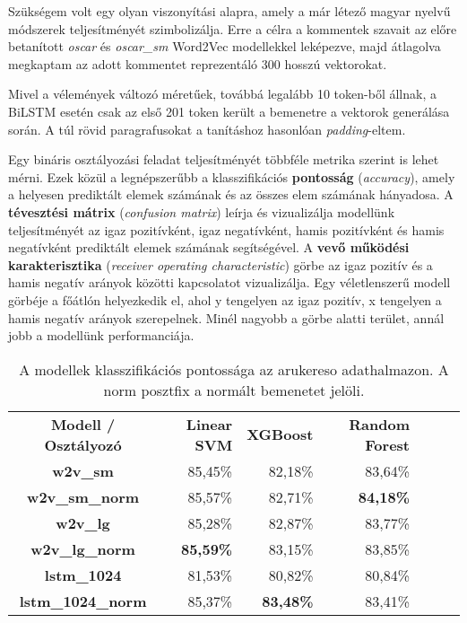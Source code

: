Szükségem volt egy olyan viszonyítási alapra, amely a már létező magyar nyelvű módszerek teljesítményét szimbolizálja. Erre a célra a kommentek szavait az előre betanított \textit{oscar} és \textit{oscar\_sm} Word2Vec modellekkel leképezve, majd átlagolva megkaptam az adott kommentet reprezentáló 300 hosszú vektorokat.

Mivel a vélemények változó méretűek, továbbá legalább 10 token-ből állnak, a BiLSTM esetén csak az első 201 token került a bemenetre a vektorok generálása során. A túl rövid paragrafusokat a tanításhoz hasonlóan \textit{padding}-eltem.

Egy bináris osztályozási feladat teljesítményét többféle metrika szerint is lehet mérni. Ezek közül a legnépszerűbb a klasszifikációs \textbf{pontosság} (\textit{accuracy}), amely a helyesen prediktált elemek számának és az összes elem számának hányadosa. A \textbf{tévesztési mátrix} (\textit{confusion matrix}) leírja és vizualizálja modellünk teljesítményét az igaz pozitívként, igaz negatívként, hamis pozitívként és hamis negatívként prediktált elemek számának segítségével. A \textbf{vevő működési karakterisztika} (\textit{receiver operating characteristic}) görbe az igaz pozitív és a hamis negatív arányok közötti kapcsolatot vizualizálja. Egy véletlenszerű modell görbéje a főátlón helyezkedik el, ahol y tengelyen az igaz pozitív, x tengelyen a hamis negatív arányok szerepelnek. Minél nagyobb a görbe alatti terület, annál jobb a modellünk performanciája.


\begin{table}[htb]
	\centering
	\begin{tabular}{ | c | r | r | r | r | r | r |}
		\hline
		\multirow{2}{*}{\textbf{Modell / Osztályozó}} & \multirow{2}{*}{\textbf{Linear SVM}} & \multirow{2}{*}{\textbf{XGBoost}} & \multirow{2}{*}{\textbf{Random Forest}} \\
		& & & \\
		\hline \hline		
		\textbf{w2v\_sm} & 85,45\% & 82,18\% & 83,64\% \\
		\hline
		\textbf{w2v\_sm\_norm} & 85,57\% & 82,71\% & \textbf{84,18\%} \\
		\hline
		\textbf{w2v\_lg} & 85,28\% & 82,87\% & 83,77\% \\
		\hline
		\textbf{w2v\_lg\_norm} & \textbf{85,59\%} & 83,15\% & 83,85\% \\
		\hline  
		\textbf{lstm\_1024} & 81,53\% & 80,82\% & 80,84\% \\
		\hline  
		\textbf{lstm\_1024\_norm} & 85,37\% & \textbf{83,48\%} & 83,41\% \\
		\hline  
	\end{tabular}
	\caption[A modellek pontossága]{A modellek klasszifikációs pontossága az arukereso adathalmazon. A norm posztfix a normált bemenetet jelöli.}
	\label{tab:evaluation}
\end{table}

